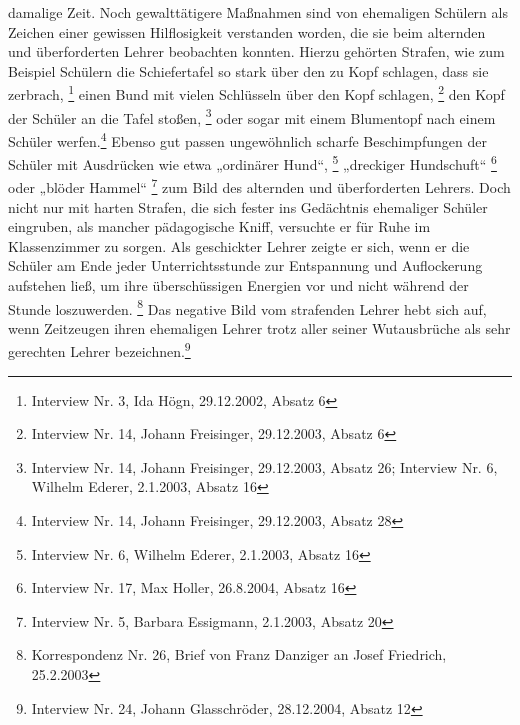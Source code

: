 \documentclass[a4paper]{article}
\begin{document}
damalige Zeit. Noch gewalttätigere Maßnahmen sind von ehemaligen
Schülern als Zeichen einer gewissen Hilflosigkeit verstanden worden,
die sie beim alternden und überforderten Lehrer beobachten konnten.
Hierzu gehörten Strafen, wie zum Beispiel Schülern die Schiefertafel so
stark über den zu Kopf schlagen, dass sie zerbrach, \footnote{Interview
Nr. 3, Ida Högn, 29.12.2002, Absatz 6} einen Bund mit vielen Schlüsseln
über den Kopf schlagen, \footnote{Interview Nr. 14, Johann Freisinger,
29.12.2003, Absatz 6} den Kopf der Schüler an die Tafel
stoßen, \footnote{Interview Nr. 14, Johann Freisinger, 29.12.2003,
Absatz 26; Interview Nr. 6, Wilhelm Ederer, 2.1.2003, Absatz 16} oder
sogar mit einem Blumentopf nach einem Schüler werfen.\footnote{
Interview Nr. 14, Johann Freisinger, 29.12.2003, Absatz 28} Ebenso gut
passen ungewöhnlich scharfe Beschimpfungen der Schüler mit Ausdrücken
wie etwa „ordinärer Hund“, \footnote{Interview Nr. 6, Wilhelm Ederer,
2.1.2003, Absatz 16} „dreckiger Hundschuft“ \footnote{Interview Nr. 17,
Max Holler, 26.8.2004, Absatz 16} oder „blöder Hammel“ \footnote{
Interview Nr. 5, Barbara Essigmann, 2.1.2003, Absatz 20} zum Bild des
alternden und überforderten Lehrers. Doch nicht nur mit harten Strafen,
die sich fester ins Gedächtnis ehemaliger Schüler eingruben, als
mancher pädagogische Kniff, versuchte er für Ruhe im Klassenzimmer zu
sorgen. Als geschickter Lehrer zeigte er sich, wenn er die Schüler am
Ende jeder Unterrichtsstunde zur Entspannung und Auflockerung aufstehen
ließ, um ihre überschüssigen Energien vor und nicht während der Stunde
loszuwerden. \footnote{Korrespondenz Nr. 26, Brief von Franz Danziger
an Josef Friedrich, 25.2.2003} Das negative Bild vom strafenden Lehrer
hebt sich auf, wenn Zeitzeugen ihren ehemaligen Lehrer trotz aller
seiner Wutausbrüche als sehr gerechten Lehrer bezeichnen.\footnote{
Interview Nr. 24, Johann Glasschröder, 28.12.2004, Absatz 12}
\end{document}
